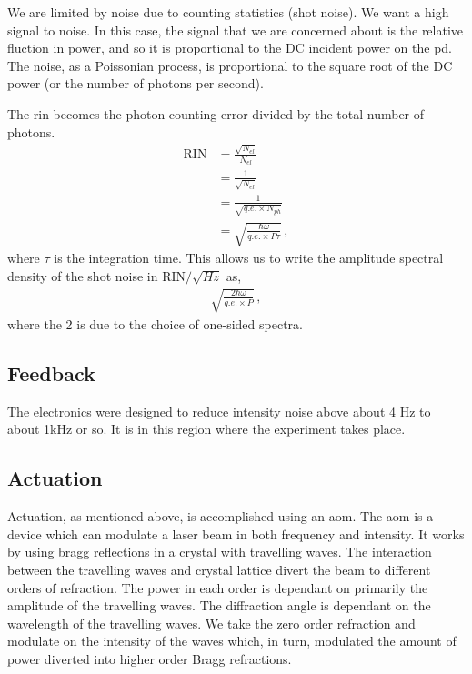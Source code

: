 We are limited by noise due to counting statistics (shot noise). We want a high signal
to noise. In this case, the signal that we are concerned about is the
relative fluction in power, and so it is proportional to the DC incident
power on the \ac{pd}. The noise, as a Poissonian process, is proportional
to the square root of the DC power (or the number of photons per second).

The \ac{rin} becomes the photon counting error divided by the total number
of photons.
\begin{align}
\mathrm{RIN} &= \frac{\sqrt{N_{el}}}{N_{el}} \\
     &= \frac{1}{\sqrt{N_{el}}} \\
     &= \frac{1}{\sqrt{q.e. \times N_{ph}}} \\
     &= \sqrt{\frac{\hbar \omega}{q.e. \times P \tau}} \, ,
\end{align}
where $\tau$ is the integration time. This allows us to write the amplitude
spectral density of the shot noise in $\mathrm{RIN} / \sqrt{H\!z}$ as,
\begin{align}
\sqrt{\frac{2 \hbar \omega}{q.e. \times P}} \, ,
\end{align}
where the 2 is due to the choice of one-sided spectra.

\subsection{Feedback}

The electronics were designed to reduce intensity noise above about 4 Hz to
about 1kHz or so. It is in this region where the experiment takes place.

\subsection{Actuation}

Actuation, as mentioned above, is accomplished using an \ac{aom}. The
\ac{aom} is a device which can modulate a laser beam in both frequency
and intensity. It works by using bragg reflections in a crystal with
travelling waves. The interaction between the travelling waves and crystal
lattice divert the beam to different orders of refraction. The power in each
order is dependant on primarily the amplitude of the travelling waves. The
diffraction angle is dependant on the wavelength of the travelling waves.
We take the zero order refraction and modulate on the intensity of the
waves which, in turn, modulated the amount of power diverted into higher order
Bragg refractions.

